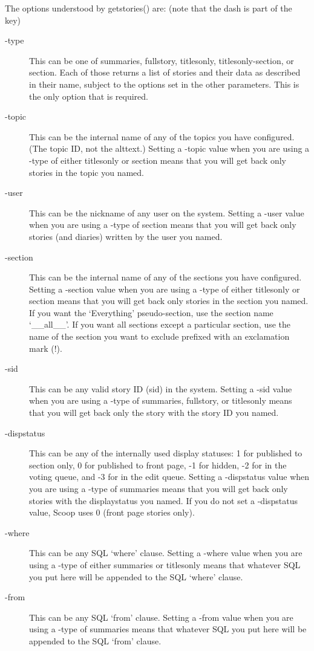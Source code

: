 \begin{description}
The options understood by getstories() are: (note that the dash is part of the key)
\begin{description}
\item[-type] This can be one of summaries, fullstory, titlesonly, titlesonly-section, or section. Each of those returns a list of stories and their data as described in their name, subject to the options set in the other parameters. This is the only option that is required.
\item[-topic] This can be the internal name of any of the topics you have configured. (The topic ID, not the alttext.) Setting a -topic value when you are using a -type of either titlesonly or section means that you will get back only stories in the topic you named.
\item[-user] This can be the nickname of any user on the system. Setting a -user value when you are using a -type of section means that you will get back only stories (and diaries) written by the user you named.
\item[-section] This can be the internal name of any of the sections you have configured. Setting a -section value when you are using a -type of either titlesonly or section means that you will get back only stories in the section you named. If you want the `Everything' pseudo-section, use the section name `\_\_all\_\_'. If you want all sections except a particular section, use the name of the section you want to exclude prefixed with an exclamation mark (!).
\item[-sid] This can be any valid story ID (sid) in the system. Setting a -sid value when you are using a -type of summaries, fullstory, or titlesonly means that you will get back only the story with the story ID you named.
\item[-dispstatus] This can be any of the internally used display statuses: 1 for published to section only, 0 for published to front page, -1 for hidden, -2 for in the voting queue, and -3 for in the edit queue. Setting a -dispstatus value when you are using a -type of summaries means that you will get back only stories with the displaystatus you named. If you do not set a -dispstatus value, Scoop uses 0 (front page stories only).
\item[-where] This can be any SQL `where' clause. Setting a -where value when you are using a -type of either summaries or titlesonly means that whatever SQL you put here will be appended to the SQL `where' clause.
\item[-from] This can be any SQL `from' clause. Setting a -from value when you are using a -type of summaries means that whatever SQL you put here will be appended to the SQL `from' clause.

\end{description}
\end{description}
